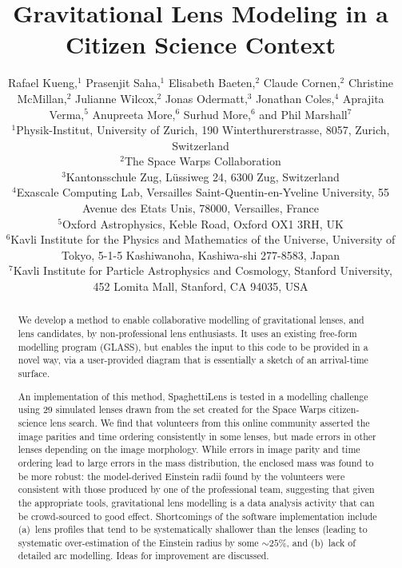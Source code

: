 \documentclass[usenatbib]{mn2e}
\newcommand{\spl}{SpaghettiLens\xspace}
\newcommand{\sw}{Space Warps\xspace}
\begin{document}
\title{Gravitational Lens Modeling in a Citizen Science Context}

\author[Kueng et al]{Rafael Kueng,$^{1}$
Prasenjit Saha,$^{1}$
Elisabeth Baeten,$^{2}$
Claude Cornen,$^{2}$
\newauthor
Christine McMillan,$^{2}$
Julianne Wilcox,$^{2}$
Jonas Odermatt,$^{3}$
Jonathan Coles,$^{4}$
\newauthor
Aprajita Verma,$^{5}$
Anupreeta More,$^{6}$
Surhud More,$^{6}$
and Phil Marshall$^{7}$ \\
$^{1}$Physik-Institut, University of Zurich, 190 Winterthurerstrasse, 8057, Zurich, Switzerland\\
$^{2}$The Space Warps Collaboration\\
$^{3}$Kantonsschule Zug, L\"ussiweg 24, 6300 Zug, Switzerland\\
$^{4}$Exascale Computing Lab, Versailles Saint-Quentin-en-Yveline University, 55 Avenue des Etats Unis, 78000, Versailles, France\\
$^{5}$Oxford Astrophysics, Keble Road, Oxford OX1 3RH, UK\\
$^{6}$Kavli Institute for the Physics and Mathematics of the Universe, University of Tokyo, 5-1-5 Kashiwanoha, Kashiwa-shi 277-8583, Japan\\
$^{7}$Kavli Institute for Particle Astrophysics and Cosmology, Stanford University, 452 Lomita Mall, Stanford, CA 94035, USA\\
}

\maketitle

\begin{abstract}

We develop a method to enable collaborative modelling of gravitational
lenses, and lens candidates, by non-professional lens enthusiasts.  It
uses an existing free-form modelling program (GLASS), but
enables the input to this code to be provided in a novel way,
via a user-provided diagram that is essentially a sketch of an
arrival-time surface.

An implementation of this method, \spl is tested in a modelling
challenge using 29 simulated lenses drawn from the set created
for the \sw citizen-science lens search.  We find that
volunteers from this online community asserted the image
parities and time ordering consistently in some lenses, but made
errors in other lenses depending on the image morphology. While
errors in image parity and time ordering lead to  large errors in the
mass distribution, the enclosed mass was found to be more
robust: the model-derived Einstein radii found by the volunteers were
consistent with those produced by one of the professional team,
suggesting that given the appropriate tools, gravitational lens
modelling is a data analysis activity that can be crowd-sourced to
good effect. Shortcomings of the software implementation 
include (a)~lens profiles that tend to be systematically shallower
than the lenses (leading to systematic over-estimation of the
Einstein radius  by some $\sim25\%$, and (b)~lack of detailed
arc modelling.  Ideas for improvement are discussed. 

\end{abstract}
\end{document}
